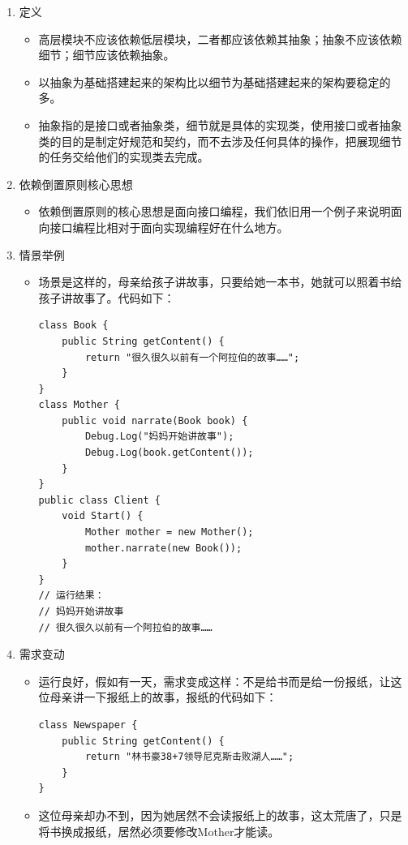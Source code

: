 \documentclass[9pt, b5paper]{article}
\begin{document}
\begin{enumerate}
\item 定义
\label{sec:orgb7f6275}
\begin{itemize}
\item 高层模块不应该依赖低层模块，二者都应该依赖其抽象；抽象不应该依赖细节；细节应该依赖抽象。
\item 以抽象为基础搭建起来的架构比以细节为基础搭建起来的架构要稳定的多。
\item 抽象指的是接口或者抽象类，细节就是具体的实现类，使用接口或者抽象类的目的是制定好规范和契约，而不去涉及任何具体的操作，把展现细节的任务交给他们的实现类去完成。
\end{itemize}
\item 依赖倒置原则核心思想
\label{sec:orgbdbbc52}
\begin{itemize}
\item 依赖倒置原则的核心思想是面向接口编程，我们依旧用一个例子来说明面向接口编程比相对于面向实现编程好在什么地方。
\end{itemize}
\item 情景举例
\label{sec:org84bb94a}
\begin{itemize}
\item 场景是这样的，母亲给孩子讲故事，只要给她一本书，她就可以照着书给孩子讲故事了。代码如下：
\begin{verbatim}
class Book {
    public String getContent() {
        return "很久很久以前有一个阿拉伯的故事……";
    }
}
class Mother {
    public void narrate(Book book) {
        Debug.Log("妈妈开始讲故事");
        Debug.Log(book.getContent());
    }
}
public class Client {
    void Start() {
        Mother mother = new Mother();
        mother.narrate(new Book());
    }
}
// 运行结果：
// 妈妈开始讲故事 
// 很久很久以前有一个阿拉伯的故事……
\end{verbatim}
\end{itemize}
\item 需求变动
\label{sec:org9e6be89}
\begin{itemize}
\item 运行良好，假如有一天，需求变成这样：不是给书而是给一份报纸，让这位母亲讲一下报纸上的故事，报纸的代码如下：
\begin{verbatim}
class Newspaper {
    public String getContent() {
        return "林书豪38+7领导尼克斯击败湖人……";
    }
}
\end{verbatim}
\item 这位母亲却办不到，因为她居然不会读报纸上的故事，这太荒唐了，只是将书换成报纸，居然必须要修改Mother才能读。

\end{itemize}
\end{enumerate}
\end{document}
